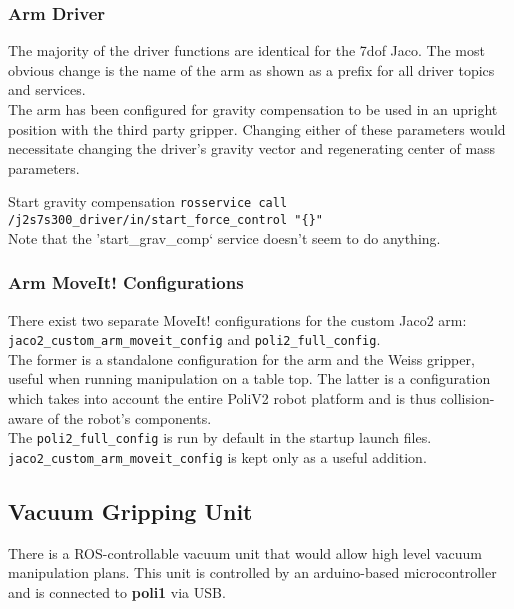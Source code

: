 \subsubsection{Arm Driver}
The majority of the driver functions are identical for the 7dof Jaco. 
The most obvious change is the name of the arm as shown as a prefix for all driver topics and services. \\

The arm has been configured for gravity compensation to be used in an upright position with the third party gripper. 
Changing either of these parameters would necessitate changing the driver's gravity vector and regenerating center of mass parameters.

\begin{example}{Start gravity compensation}
  \label{ex:start_gravity_compensation}
    \texttt{rosservice call /j2s7s300\_driver/in/start\_force\_control "\{\}"} \\
    Note that the 'start\_grav\_comp` service doesn't seem to do anything.
\end{example}

\subsubsection{Arm MoveIt! Configurations}
There exist two separate MoveIt! configurations for the custom Jaco2 arm: \\
\texttt{jaco2\_custom\_arm\_moveit\_config} and \texttt{poli2\_full\_config}. \\

The former is a standalone configuration for the arm and the Weiss gripper, useful when running manipulation on a table top. 
The latter is a configuration which takes into account the entire PoliV2 robot platform and is thus collision-aware of the robot's components. \\

The \texttt{poli2\_full\_config} is run by default in the startup launch files. \\
\texttt{jaco2\_custom\_arm\_moveit\_config} is kept only as a useful addition.


\subsection{Vacuum Gripping Unit}
There is a ROS-controllable vacuum unit that would allow high level vacuum manipulation plans. 
This unit is controlled by an arduino-based microcontroller and is connected to \textbf{poli1} via USB. \\

